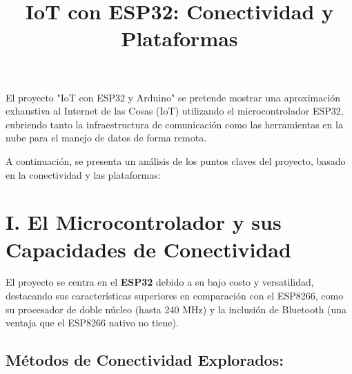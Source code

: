 \documentclass{article}
\title{IoT con ESP32: Conectividad y Plataformas}
\author{}
\date{}
\begin{document}
\maketitle

El proyecto "IoT con ESP32 y Arduino" se pretende mostrar una 
aproximación exhaustiva al Internet de las Cosas (IoT) utilizando el 
microcontrolador ESP32, cubriendo tanto la infraestructura de 
comunicación como las herramientas en la nube para el manejo de datos de 
forma remota.

A continuación, se presenta un análisis de los puntos claves del proyecto, 
basado en la conectividad y las plataformas:

\section*{I. El Microcontrolador y sus Capacidades de Conectividad}

El proyecto se centra en el \textbf{ESP32} debido a su bajo costo y 
versatilidad, destacando sus características superiores en comparación 
con el ESP8266, como su procesador de doble núcleo (hasta 240 MHz) y la 
inclusión de Bluetooth (una ventaja que el ESP8266 nativo no tiene).

\subsection*{Métodos de Conectividad Explorados:}
\end{document}
